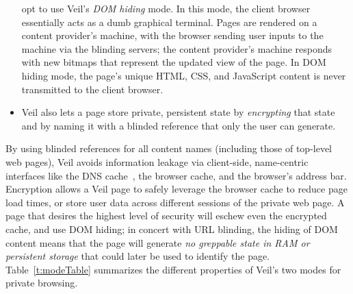 \begin{itemize}
	opt to use Veil's \emph{DOM hiding} mode. In this
	mode, the client browser essentially acts as a dumb
	graphical terminal. Pages are rendered on a content
	provider's machine, with the browser sending user inputs
	to the machine via the blinding servers; the content
	provider's machine responds with new bitmaps that
	represent the updated view of the page. In DOM hiding
	mode, the page's unique HTML, CSS, and JavaScript content
	is never transmitted to the client browser.
	\item Veil also lets a page store private, persistent
	state by \emph{encrypting} that state and by naming
	it with a blinded reference that only the user can
	generate.
\end{itemize}
By using blinded references for all content names (including
those of top-level web pages), Veil avoids information leakage
via client-side, name-centric interfaces like the
DNS cache~\cite{timingAttacks}, the browser cache, and
the browser's address bar.
Encryption allows a Veil page to safely leverage the
browser cache to reduce page load times, or store user data
across different sessions of the private web page. A page
that desires the highest level of security will eschew even
the encrypted cache, and use DOM hiding; in concert with URL
blinding, the hiding of DOM content means that the page will
generate \emph{no greppable state in RAM or persistent storage}
that could later be used to identify the page. Table~\ref{t:modeTable}
summarizes the different properties of Veil's two modes for
private browsing.

